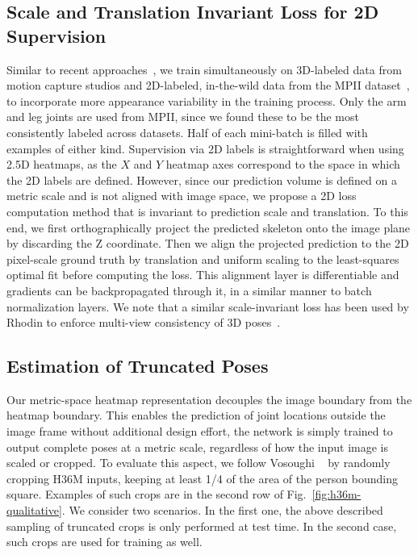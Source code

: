 \begin{figure*}
\caption{Qualitative results of our method on different datasets. Predictions are shown in color, ground truth in gray (except for MPII, where it is unavailable). Green spheres mark predictions within 150 mm of the ground truth, red cubes beyond that threshold. \emph{Best viewed in color.}}
\label{fig:h36m-qualitative}
\end{figure*} \subsection{Scale and Translation Invariant Loss for 2D Supervision}
Similar to recent approaches~\cite{Zhou17ICCV,Sun18ECCV,Luvizon18CVPR}, we train simultaneously on 3D-labeled data from motion capture studios and 2D-labeled, in-the-wild data from the MPII dataset~\cite{Andriluka14CVPR}, to incorporate more appearance variability in the training process.
Only the arm and leg joints are used from MPII, since we found these to be the most consistently labeled across datasets.
Half of each mini-batch is filled with examples of either kind.
Supervision via 2D labels is straightforward when using 2.5D heatmaps, as the $X$ and $Y$ heatmap axes correspond to the space in which the 2D labels are defined.
However, since our prediction volume is defined on a metric scale and is not aligned with image space, we propose a 2D loss computation method that is invariant to prediction scale and translation.
To this end, we first orthographically project the predicted skeleton onto the image plane by discarding the Z coordinate.
Then we align the projected prediction to the 2D pixel-scale ground truth by translation and uniform scaling to the least-squares optimal fit before computing the loss.
This alignment layer is differentiable and gradients can be backpropagated through it, in a similar manner to batch normalization layers.
We note that a similar scale-invariant loss has been used by Rhodin \etal to enforce multi-view consistency of 3D poses~\cite{Rhodin18CVPR}.
\subsection{Estimation of Truncated Poses}
Our metric-space heatmap representation decouples the image boundary from the heatmap boundary.
This enables the prediction of joint locations outside the image frame without additional design effort, the network is simply trained to output complete poses at a metric scale, regardless of how the input image is scaled or cropped.
To evaluate this aspect, we follow Vosoughi \etal~\cite{Vosoughi18ICIP} by randomly cropping H36M inputs, keeping at least 1/4 of the area of the person bounding square.
Examples of such crops are in the second row of Fig.~\ref{fig:h36m-qualitative}.
We consider two scenarios.
In the first one, the above described sampling of truncated crops is only performed at test time.
In the second case, such crops are used for training as well.
